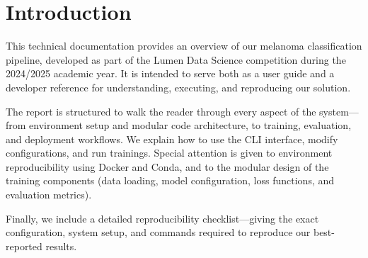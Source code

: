 \chapter{Introduction}
\label{ch:intro}

This technical documentation provides an overview of our melanoma classification pipeline, developed as part of the Lumen Data Science competition during the 2024/2025 academic year. It is intended to serve both as a user guide and a developer reference for understanding, executing, and reproducing our solution.

The report is structured to walk the reader through every aspect of the system—from environment setup and modular code architecture, to training, evaluation, and deployment workflows. We explain how to use the CLI interface, modify configurations, and run trainings. Special attention is given to environment reproducibility using Docker and Conda, and to the modular design of the training components (data loading, model configuration, loss functions, and evaluation metrics).

Finally, we include a detailed reproducibility checklist—giving the exact configuration, system setup, and commands required to reproduce our best-reported results.